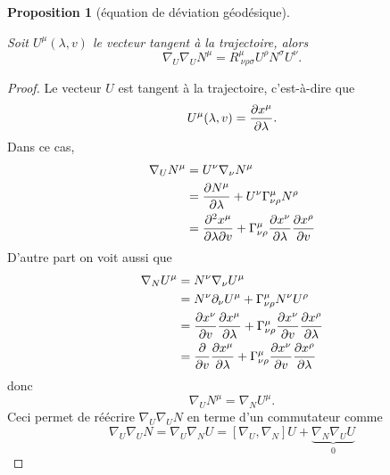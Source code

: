 \documentclass[a4paper,11pt]{report}
\theoremstyle{definition}
\theoremstyle{plain}
\newtheorem{prop}[thm]{Proposition}
\theoremstyle{definition}
\theoremstyle{remark}
\newcommand{\p}{\partial}
\begin{document}
            \begin{prop}[équation de déviation géodésique]\begin{leftbar}
                Soit $U^\mu(\lambda,v)$ le vecteur tangent à la trajectoire, alors
                \begin{equation}
                    \nabla_U\nabla_U N^\mu = R^\mu_{~\nu\rho\sigma}U^\rho N^\sigma U^\nu.
                \end{equation}
            \end{leftbar}\end{prop}
            
            \begin{proof}
                Le vecteur $U$ est tangent à la trajectoire, c'est-à-dire que
                \begin{equation}
                    U^\mu(\lambda,v) = \pdv{x^\mu}{\lambda}.
                \end{equation}
                Dans ce cas,
                \begin{align}
                    \nabla_U N^\mu &= U^\nu\nabla_\nu N^\mu\\
                    &= \pdv{N^\mu}{\lambda}+U^\nu\Gamma^\mu_{\nu\rho}N^\rho\\
                    &= \pdv{x^\mu}{\lambda}{v} + \Gamma^\mu_{\nu\rho}\pdv{x^\nu}{\lambda}\pdv{x^\rho}{v}
                \end{align}
                D'autre part on voit aussi que
                \begin{align}
                    \nabla_N U^\mu &= N^\nu \nabla_\nu U^\mu\\
                    &= N^\nu\p_\nu U^\mu + \Gamma^\mu_{\nu\rho} N^\nu U^\rho\\
                    &= \pdv{x^\nu}{v}\pdv{x^\mu}{\lambda} + \Gamma^\mu_{\nu\rho}\pdv{x^\nu}{v}\pdv{x^\rho}{\lambda}\\
                    &= \pdv{}{v}\pdv{x^\mu}{\lambda} + \Gamma^\mu_{\nu\rho}\pdv{x^\nu}{v}\pdv{x^\rho}{\lambda}
                \end{align}
                donc
                \begin{equation}
                    \nabla_U N^\mu = \nabla_N U^\mu.
                \end{equation}
                Ceci permet de réécrire $\nabla_U\nabla_U N$ en terme d'un commutateur comme
                \begin{equation}
                    \nabla_U\nabla_U N = \nabla_U\nabla_N U = [\nabla_U,\nabla_N]U+\underbrace{\nabla_N\nabla_U U}_{0}

\end{equation}
\end{proof}
\end{document}
